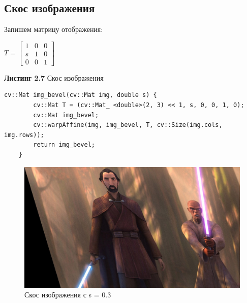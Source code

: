 \subsection{Скос изображения}
Запишем матрицу отображения:
\begin{center}
    $T = 
    \begin{bmatrix}
        1 & 0 & 0\\
        s & 1 & 0\\
        0 & 0 & 1
    \end{bmatrix}
    $
\end{center}
\noindent \textbf{Листинг 2.7} Скос изображения
\begin{lstlisting}
cv::Mat img_bevel(cv::Mat img, double s) {
        cv::Mat T = (cv::Mat_ <double>(2, 3) << 1, s, 0, 0, 1, 0);
        cv::Mat img_bevel;
        cv::warpAffine(img, img_bevel, T, cv::Size(img.cols, img.rows));
        return img_bevel;
    } 
\end{lstlisting}
\begin{figure}[h]
    \centering
    \includegraphics[scale=0.3]{"../images/results/img_bevel.jpg"}
    \caption{Скос изображения с s = 0.3}
\end{figure}
\newpage
